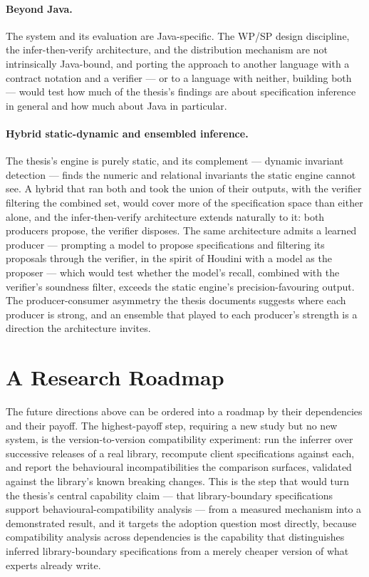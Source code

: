 \paragraph{Beyond Java.} The system and its evaluation are Java-specific. The
WP/SP design discipline, the infer-then-verify architecture, and the
distribution mechanism are not intrinsically Java-bound, and porting the approach
to another language with a contract notation and a verifier --- or to a language
with neither, building both --- would test how much of the thesis's findings are
about specification inference in general and how much about Java in particular.

\paragraph{Hybrid static-dynamic and ensembled inference.} The thesis's engine is
purely static, and its complement --- dynamic invariant detection --- finds the
numeric and relational invariants the static engine cannot see. A hybrid that ran
both and took the union of their outputs, with the verifier filtering the combined
set, would cover more of the specification space than either alone, and the
infer-then-verify architecture extends naturally to it: both producers propose,
the verifier disposes. The same architecture admits a learned producer ---
prompting a model to propose specifications and filtering its proposals through the
verifier, in the spirit of Houdini with a model as the proposer --- which would
test whether the model's recall, combined with the verifier's soundness filter,
exceeds the static engine's precision-favouring output. The producer-consumer
asymmetry the thesis documents suggests where each producer is strong, and an
ensemble that played to each producer's strength is a direction the architecture
invites.

\section{A Research Roadmap}

The future directions above can be ordered into a roadmap by their dependencies and
their payoff. The highest-payoff step, requiring a new study but no new system, is
the version-to-version compatibility experiment: run the inferrer over successive
releases of a real library, recompute client specifications against each, and report
the behavioural incompatibilities the comparison surfaces, validated against the
library's known breaking changes. This is the step that would turn the thesis's
central capability claim --- that library-boundary specifications support
behavioural-compatibility analysis --- from a measured mechanism into a demonstrated
result, and it targets the adoption question most directly, because compatibility
analysis across dependencies is the capability that distinguishes inferred
library-boundary specifications from a merely cheaper version of what experts
already write.

